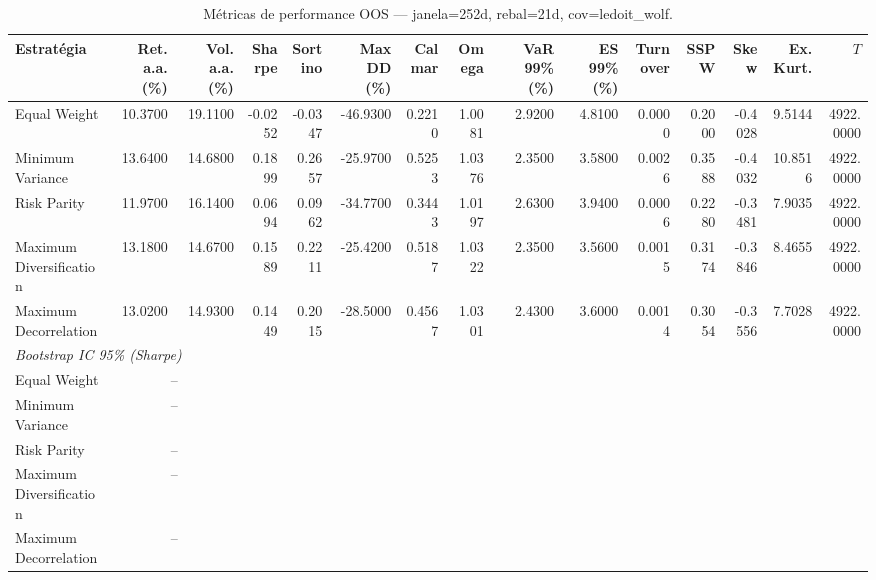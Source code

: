 \begin{table}[htbp]
  \centering
  \caption{Métricas de performance OOS — janela=252d, rebal=21d, cov=ledoit_wolf.}
  \label{tab:comparison_performance}
  \footnotesize
  \begin{tabular}{lrrrrrrrrrrrrrr}
  \toprule
  Estratégia & Ret. a.a. (\%) & Vol. a.a. (\%) & Sharpe & Sortino & Max DD (\%) & Calmar & Omega & VaR 99\% (\%) & ES 99\% (\%) & Turnover & SSPW & Skew & Ex. Kurt. & $T$ \\
  \midrule
  Equal Weight & 10.3700 & 19.1100 & -0.0252 & -0.0347 & -46.9300 & 0.2210 & 1.0081 & 2.9200 & 4.8100 & 0.0000 & 0.2000 & -0.4028 & 9.5144 & 4922.0000 \\
  Minimum Variance & 13.6400 & 14.6800 & 0.1899 & 0.2657 & -25.9700 & 0.5253 & 1.0376 & 2.3500 & 3.5800 & 0.0026 & 0.3588 & -0.4032 & 10.8516 & 4922.0000 \\
  Risk Parity & 11.9700 & 16.1400 & 0.0694 & 0.0962 & -34.7700 & 0.3443 & 1.0197 & 2.6300 & 3.9400 & 0.0006 & 0.2280 & -0.3481 & 7.9035 & 4922.0000 \\
  Maximum Diversification & 13.1800 & 14.6700 & 0.1589 & 0.2211 & -25.4200 & 0.5187 & 1.0322 & 2.3500 & 3.5600 & 0.0015 & 0.3174 & -0.3846 & 8.4655 & 4922.0000 \\
  Maximum Decorrelation & 13.0200 & 14.9300 & 0.1449 & 0.2015 & -28.5000 & 0.4567 & 1.0301 & 2.4300 & 3.6000 & 0.0014 & 0.3054 & -0.3556 & 7.7028 & 4922.0000 \\
  \bottomrule
  \midrule
  \multicolumn{15}{l}{\textit{Bootstrap IC 95\% (Sharpe)}}
  \\
  Equal Weight & \multicolumn{2}{c}{--} \\
  Minimum Variance & \multicolumn{2}{c}{--} \\
  Risk Parity & \multicolumn{2}{c}{--} \\
  Maximum Diversification & \multicolumn{2}{c}{--} \\
  Maximum Decorrelation & \multicolumn{2}{c}{--} \\
  \end{tabular}
\end{table}